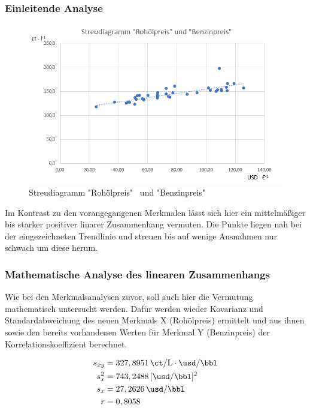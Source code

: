 \subsubsection{Einleitende Analyse}
\begin{figure}[H]
  \centering
  \includegraphics[width = \textwidth]{graphics/streurohbenz.png}
  \caption{Streudiagramm "Rohölpreis" \, und "Benzinpreis"}
  \label{fig:streuRohBenz}
\end{figure}
Im Kontrast zu den vorangegangenen Merkmalen lässt sich hier ein mittelmäßiger bis starker positiver linarer Zusammenhang vermuten. Die Punkte liegen nah bei der eingezeichneten Trendlinie und streuen bis auf wenige Ausnahmen nur schwach um diese herum.\\

\subsubsection{Mathematische Analyse des linearen Zusammenhangs}
Wie bei den Merkmalsanalysen zuvor, soll auch hier die Vermutung mathematisch untersucht werden. Dafür werden wieder Kovarianz und Standardabweichung des neuen Merkmals X (Rohölpreis) ermittelt und aus ihnen sowie den bereits vorhandenen Werten für Merkmal Y (Benzinpreis) der Korrelationskoeffizient berechnet.

\begin{align}
  s_{xy} &= 327,8951 \, \si{\ct\per\liter} \cdot \si{\usd\per\bbl}\\
  s_{x}^2 &= 743,2488 \, [\si{\usd\per\bbl}]^2\\
  s_x &= 27,2626 \, \si{\usd\per\bbl}\\
  r &= 0,8058
\end{align}

